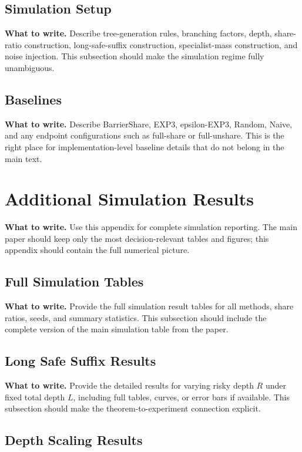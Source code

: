 \documentclass{article}
\newcommand{\towrite}[1]{\noindent\textbf{What to write.} #1}
\begin{document}
\subsection{Simulation Setup}

\towrite{Describe tree-generation rules, branching factors, depth, share-ratio construction, long-safe-suffix construction, specialist-mass construction, and noise injection. This subsection should make the simulation regime fully unambiguous.}

\subsection{Baselines}

\towrite{Describe BarrierShare, EXP3, epsilon-EXP3, Random, Naive, and any endpoint configurations such as full-share or full-unshare. This is the right place for implementation-level baseline details that do not belong in the main text.}

\section{Additional Simulation Results}

\towrite{Use this appendix for complete simulation reporting. The main paper should keep only the most decision-relevant tables and figures; this appendix should contain the full numerical picture.}

\subsection{Full Simulation Tables}

\towrite{Provide the full simulation result tables for all methods, share ratios, seeds, and summary statistics. This subsection should include the complete version of the main simulation table from the paper.}

\subsection{Long Safe Suffix Results}

\towrite{Provide the detailed results for varying risky depth $R$ under fixed total depth $L$, including full tables, curves, or error bars if available. This subsection should make the theorem-to-experiment connection explicit.}

\subsection{Depth Scaling Results}
\end{document}
